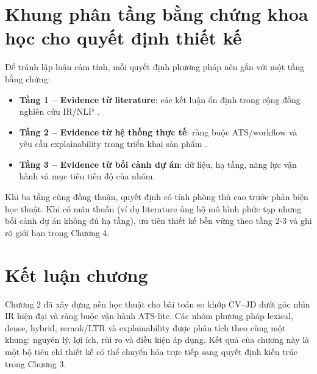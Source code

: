 \section{Khung phân tầng bằng chứng khoa học cho quyết định thiết kế}

Để tránh lập luận cảm tính, mỗi quyết định phương pháp nên gắn với một tầng bằng chứng:

\begin{itemize}
  \item \textbf{Tầng 1 -- Evidence từ literature}: các kết luận ổn định trong cộng đồng nghiên cứu IR/NLP \cite{prf-bm25,dpr,sbert,lambdamart}.
  \item \textbf{Tầng 2 -- Evidence từ hệ thống thực tế}: ràng buộc ATS/workflow và yêu cầu explainability trong triển khai sản phẩm \cite{greenhouse,lever,workday}.
  \item \textbf{Tầng 3 -- Evidence từ bối cảnh dự án}: dữ liệu, hạ tầng, năng lực vận hành và mục tiêu tiến độ của nhóm.
\end{itemize}

Khi ba tầng cùng đồng thuận, quyết định có tính phòng thủ cao trước phản biện học thuật. Khi có mâu thuẫn (ví dụ literature ủng hộ mô hình phức tạp nhưng bối cảnh dự án không đủ hạ tầng), ưu tiên thiết kế bền vững theo tầng 2-3 và ghi rõ giới hạn trong Chương 4.

\section{Kết luận chương}

Chương 2 đã xây dựng nền học thuật cho bài toán so khớp CV--JD dưới góc nhìn IR hiện đại và ràng buộc vận hành ATS-lite. Các nhóm phương pháp lexical, dense, hybrid, rerank/LTR và explainability được phân tích theo cùng một khung: nguyên lý, lợi ích, rủi ro và điều kiện áp dụng. Kết quả của chương này là một bộ tiêu chí thiết kế có thể chuyển hóa trực tiếp sang quyết định kiến trúc trong Chương 3.
